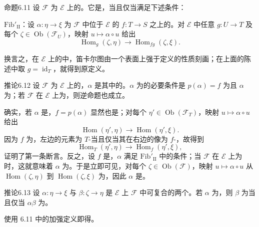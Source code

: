 \begin{SGAresult}{命题}{6.11}
设 $\mathcal F$ 为 $\mathcal E$ 上的。它是，当且仅当满足下述条件：

$\mathrm{Fib}'_{\mathrm{II}}$：设 $\alpha:\eta\to\xi$ 为 $\mathcal F$ 中位于 $\mathcal E$ 的 $f:T\to S$ 之上的。对 $\mathcal E$ 中任意 $g:U\to T$ 及每个 $\zeta\in\operatorname{Ob}(\mathcal F_U)$，映射 $u\mapsto\alpha\circ u$ 给出
\[
 \operatorname{Hom}_g(\zeta,\eta)\longrightarrow\operatorname{Hom}_{fg}(\zeta,\xi).
\]
\end{SGAresult}
换言之，在 $\mathcal E$ 上的中，笛卡尔图由一个表面上强于定义的性质刻画；在上面的陈述中取 $g=\operatorname{id}_T$，就得到原定义。

\begin{SGAresult}{推论}{6.12}
设 $\mathcal F$ 为 $\mathcal E$ 上的，$\alpha$ 是其中的。$\alpha$ 为的必要条件是 $p(\alpha)=f$ 为且 $\alpha$ 为；若 $\mathcal F$ 在 $\mathcal E$ 上为，则逆命题也成立。
\end{SGAresult}
确实，若 $\alpha$ 是，$f=p(\alpha)$ 显然也是；对每个 $\eta'\in\operatorname{Ob}(\mathcal F_T)$，映射 $u\mapsto\alpha\circ u$ 给出
\[
 \operatorname{Hom}(\eta',\eta)\longrightarrow\operatorname{Hom}(\eta',\xi).
\]
因为 $f$ 为，左边的元素为 $T$-当且仅当其在右边的像为 $f$-，故得到
\[
 \operatorname{Hom}_T(\eta',\eta)\longrightarrow\operatorname{Hom}_f(\eta',\xi),
\]
证明了第一条断言。反之，设 $f$ 是，$\alpha$ 满足 $\mathrm{Fib}'_{\mathrm{II}}$ 中的条件；当 $\mathcal F$ 在 $\mathcal E$ 上为时，这就意味着 $\alpha$ 为。于是立即可见，对每个 $\zeta\in\operatorname{Ob}(\mathcal F)$，映射 $u\mapsto\alpha\circ u$ 从 $\operatorname{Hom}(\zeta,\eta)$ 到 $\operatorname{Hom}(\zeta,\xi)$ 为，因此 $\alpha$ 是。

\begin{SGAresult}{推论}{6.13}
设 $\alpha:\eta\to\xi$ 与 $\beta:\zeta\to\eta$ 是 $\mathcal E$ 上 $\mathcal F$ 中可复合的两个。若 $\alpha$ 为，则 $\beta$ 为当且仅当 $\alpha\beta$ 为。
\end{SGAresult}
使用 6.11 中的加强定义即得。

